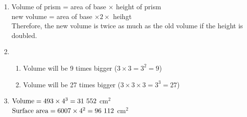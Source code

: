 \begin{solutions}{}{
\begin{enumerate}[itemsep=5pt, label=\textbf{\arabic*}. ] 
\item Volume of prism = area of base $\times$ height of prism \\
new volume = area of base $\times 2 \times$ heihgt \\
Therefore, the new volume is twice as much as the old volume if the height is doubled. 
\item \begin{enumerate}[itemsep=5pt, label=\textbf{(\alph*)}]
       \item Volume will be 9 times bigger ($3 \times 3 = 3^{2} = 9$)
\item Volume will be 27 times bigger ($3 \times 3 \times 3 = 3^{3} = 27$)
      \end{enumerate}
\item $\mbox{Volume} = 493 \times 4^{3} \\
= 31~552 ~$cm$^{2}$ \\
$\mbox{Surface area} = 6007 \times 4^{2} \\
= 96~112 ~$cm$^{2}$
\end{enumerate}}
\end{solutions}


